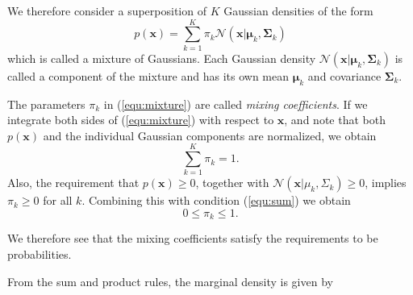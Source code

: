 ﻿\documentclass[a4paper, 11pt]{article}
\numberwithin{equation}{subsection}
\begin{document}
We therefore consider a superposition of $K$ Gaussian densities of the form
\begin{equation}\label{equ:mixture}
p(\mathbf x)=\sum_{k=1}^K\pi_k\mathcal N(\mathbf x|\boldsymbol\mu_k,\boldsymbol\Sigma_k)
\end{equation}
which is called a mixture of Gaussians. Each Gaussian density  $\mathcal N(\mathbf x|\boldsymbol\mu_k,\boldsymbol\Sigma_k)$ is called a component of the mixture and has its own mean $\boldsymbol\mu_k$ and covariance $\boldsymbol\Sigma_k$.

The parameters $\pi_k$ in (\ref{equ:mixture}) are called \emph{mixing coefficients}. If we integrate both sides of (\ref{equ:mixture}) with respect to $\mathbf x$, and note that both $p(\mathbf x)$ and the individual Gaussian
components are normalized, we obtain
\begin{equation}\label{equ:sum}
\sum_{k=1}^{K}\pi_k=1.
\end{equation}
Also, the requirement that $p(\mathbf x)\geq 0$, together with $\mathcal N(\mathbf x|\mu_k,\Sigma_k)\geq 0$, implies $\pi_k\geq 0$ for all $k$. Combining this with condition (\ref{equ:sum}) we obtain
\begin{equation}
0\leq\pi_k\leq 1.
\end{equation}

We therefore see that the mixing coefficients satisfy the requirements to be probabilities.

From the sum and product rules, the marginal density is given by
\end{document}
